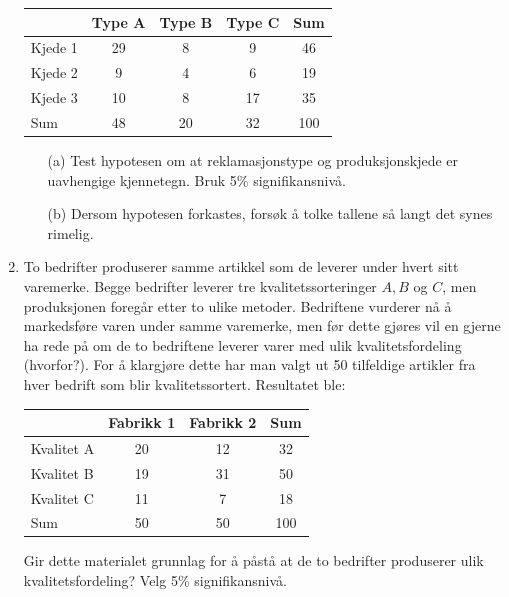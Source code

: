 \begin{enumerate}
\begin{center}
\begin{tabular}{l|ccc|c}
         &  Type A  &  Type B  &  Type C  &   Sum  \\  \hline
Kjede 1  &    29    &    8     &    9     &    46  \\
Kjede 2  &     9    &    4     &    6     &    19  \\
Kjede 3  &    10    &    8     &   17     &    35  \\  \hline
Sum      &    48    &   20     &   32     &   100  \\  \hline
\end{tabular}
\end{center}

\begin{itemize}
\item[(a)] Test hypotesen om at reklamasjonstype og produksjonskjede er
uav\-hengige kjennetegn.  Bruk 5\% signifikansnivå.
\item[(b)] Dersom hypotesen forkastes, forsøk å tolke tallene
så langt det synes rimelig.
\end{itemize}

\item
To bedrifter produserer samme artikkel som de leverer under hvert sitt
varemerke.  Begge bedrifter leverer tre kvalitetssorteringer $A, B$ og $C$,
men produksjonen foregår etter to ulike metoder.  Bedriftene
vurderer nå å markedsføre varen under samme varemerke, men
før dette gjøres vil en gjerne ha rede på om de to bedriftene
leverer varer med ulik kvalitetsfordeling (hvorfor?).  For å 
klargjøre dette har man valgt ut 50 tilfeldige artikler fra hver bedrift
som blir kvalitetssortert.  Resultatet ble:

\begin{center}
\begin{tabular}{l|cc|c}
            &  Fabrikk 1  &  Fabrikk 2   &   Sum  \\  \hline
Kvalitet A  &     20      &     12       &    32  \\  
Kvalitet B  &     19      &     31       &    50  \\
Kvalitet C  &     11      &      7       &    18  \\  \hline
Sum         &     50      &     50       &   100  \\  \hline
\end{tabular}
\end{center}

Gir dette materialet grunnlag for å påstå at de to bedrifter
produserer ulik kvalitetsfordeling?  Velg 5\% signifikansnivå.


\end{enumerate}
